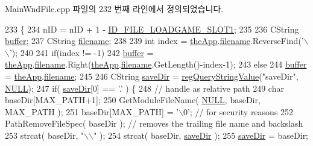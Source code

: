 Main\+Wnd\+File.\+cpp 파일의 232 번째 라인에서 정의되었습니다.


\begin{DoxyCode}
233 \{
234   nID = nID + 1 - \mbox{\hyperlink{resource_8h_a08f948c6a7595869554e3cf8459c2836}{ID\_FILE\_LOADGAME\_SLOT1}};
235 
236   CString \mbox{\hyperlink{_g_b_a_8cpp_a28d4d3d8445e73a696b2d6f7eadabd96}{buffer}};
237   CString \mbox{\hyperlink{_s_d_l_8cpp_ac33a174c39700095ca0f892624d85a3f}{filename}};
238 
239   \textcolor{keywordtype}{int} index = \mbox{\hyperlink{_v_b_a_8cpp_a8095a9d06b37a7efe3723f3218ad8fb3}{theApp}}.\mbox{\hyperlink{class_v_b_a_a66eee6b61ec8bee20f21164cb0c37d2d}{filename}}.ReverseFind(\textcolor{charliteral}{'\(\backslash\)\(\backslash\)'});
240 
241   \textcolor{keywordflow}{if}(index != -1)
242     \mbox{\hyperlink{_g_b_a_8cpp_a28d4d3d8445e73a696b2d6f7eadabd96}{buffer}} = \mbox{\hyperlink{_v_b_a_8cpp_a8095a9d06b37a7efe3723f3218ad8fb3}{theApp}}.\mbox{\hyperlink{class_v_b_a_a66eee6b61ec8bee20f21164cb0c37d2d}{filename}}.Right(\mbox{\hyperlink{_v_b_a_8cpp_a8095a9d06b37a7efe3723f3218ad8fb3}{theApp}}.\mbox{\hyperlink{class_v_b_a_a66eee6b61ec8bee20f21164cb0c37d2d}{filename}}.GetLength()-index-1);
243   \textcolor{keywordflow}{else}
244     \mbox{\hyperlink{_g_b_a_8cpp_a28d4d3d8445e73a696b2d6f7eadabd96}{buffer}} = \mbox{\hyperlink{_v_b_a_8cpp_a8095a9d06b37a7efe3723f3218ad8fb3}{theApp}}.\mbox{\hyperlink{class_v_b_a_a66eee6b61ec8bee20f21164cb0c37d2d}{filename}};
245 
246   CString \mbox{\hyperlink{_s_d_l_8cpp_a7b37d94db9ce90c610565cb80ff50444}{saveDir}} = \mbox{\hyperlink{_reg_8cpp_a618826d274df0d9c19fab2ff28bd9008}{regQueryStringValue}}(\textcolor{stringliteral}{"saveDir"}, 
      \mbox{\hyperlink{getopt1_8c_a070d2ce7b6bb7e5c05602aa8c308d0c4}{NULL}});
247   \textcolor{keywordflow}{if}( \mbox{\hyperlink{_s_d_l_8cpp_a7b37d94db9ce90c610565cb80ff50444}{saveDir}}[0] == \textcolor{charliteral}{'.'} ) \{
248       \textcolor{comment}{// handle as relative path}
249       \textcolor{keywordtype}{char} baseDir[MAX\_PATH+1];
250       GetModuleFileName( \mbox{\hyperlink{getopt1_8c_a070d2ce7b6bb7e5c05602aa8c308d0c4}{NULL}}, baseDir, MAX\_PATH );
251       baseDir[MAX\_PATH] = \textcolor{charliteral}{'\(\backslash\)0'}; \textcolor{comment}{// for security reasons}
252       PathRemoveFileSpec( baseDir ); \textcolor{comment}{// removes the trailing file name and backslash}
253       strcat( baseDir, \textcolor{stringliteral}{"\(\backslash\)\(\backslash\)"} );
254       strcat( baseDir, \mbox{\hyperlink{_s_d_l_8cpp_a7b37d94db9ce90c610565cb80ff50444}{saveDir}} );
255       \mbox{\hyperlink{_s_d_l_8cpp_a7b37d94db9ce90c610565cb80ff50444}{saveDir}} = baseDir;

\end{DoxyCode}
